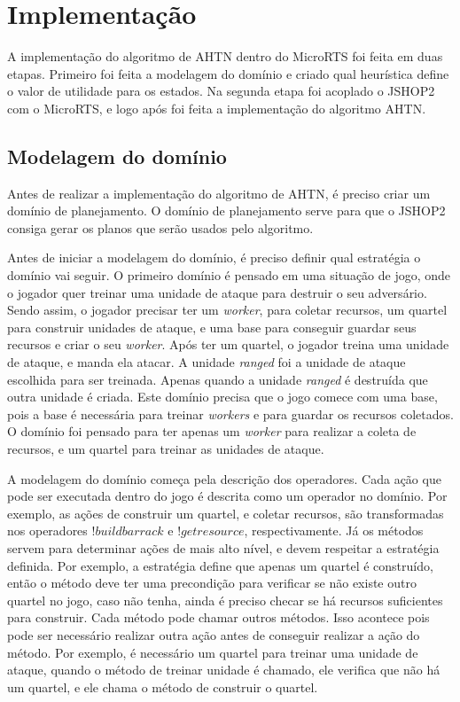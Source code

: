 
\chapter{\label{chap:impl}Implementação}

A implementação do algoritmo de AHTN dentro do MicroRTS foi feita em duas etapas.
Primeiro foi feita a modelagem do domínio e criado qual heurística define o valor de utilidade para os estados.
Na segunda etapa foi acoplado o JSHOP2 com o MicroRTS, e logo após foi feita a implementação do algoritmo AHTN.


\section{Modelagem do domínio}

Antes de realizar a implementação do algoritmo de AHTN, é preciso criar um domínio de planejamento. 
O domínio de planejamento serve para que o JSHOP2 consiga gerar os planos que serão usados pelo algoritmo.

Antes de iniciar a modelagem do domínio, é preciso definir qual estratégia o domínio vai seguir.
O primeiro domínio é pensado em uma situação de jogo, onde o jogador quer treinar uma unidade de ataque para destruir o seu adversário.
Sendo assim, o jogador precisar ter um \textit{worker}, para coletar recursos, um quartel para construir unidades de ataque, e uma base para conseguir guardar seus recursos e criar o seu \textit{worker}. 
Após ter um quartel, o jogador treina uma unidade de ataque, e manda ela atacar.
A unidade \textit{ranged} foi a unidade de ataque escolhida para ser treinada.
Apenas quando a unidade \textit{ranged} é destruída que outra unidade é criada.
Este domínio precisa que o jogo comece com uma base, pois a base é necessária para treinar \textit{workers} e para guardar os recursos coletados.  
O domínio foi pensado para ter apenas um \textit{worker} para realizar a coleta de recursos, e um quartel para treinar as unidades de ataque.

A modelagem do domínio começa pela descrição dos operadores.
Cada ação que pode ser executada dentro do jogo é descrita como um operador no domínio.
Por exemplo, as ações de construir um quartel, e coletar recursos, são transformadas nos operadores $!buildbarrack$ e $!getresource$, respectivamente.
Já os métodos servem para determinar ações de mais alto nível, e devem respeitar a estratégia definida.
Por exemplo, a estratégia define que apenas um quartel é construído, então o método deve ter uma precondição para verificar se não existe outro quartel no jogo, caso não tenha, ainda é preciso checar se há recursos suficientes para construir. 
Cada método pode chamar outros métodos.
Isso acontece pois pode ser necessário realizar outra ação antes de conseguir realizar a ação do método.
Por exemplo, é necessário um quartel para treinar uma unidade de ataque, quando o método de treinar unidade é chamado, ele verifica que não há um quartel, e ele chama o método de construir o quartel.

